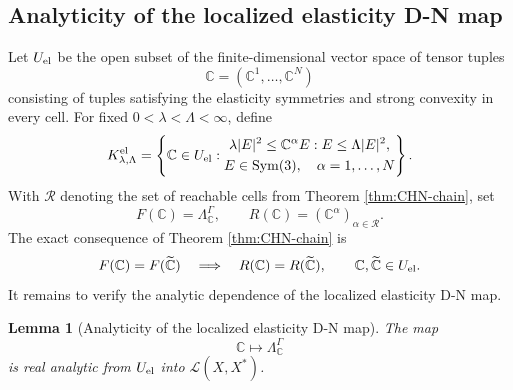 \documentclass[12pt,oneside]{amsart}
\newtheorem{lemma}[theorem]{Lemma}
\newcommand{\cL}{\mathcal L}
\newcommand{\cR}{\mathcal R}
\newcommand{\Sym}{\operatorname{Sym}}
\begin{document}
\subsection{Analyticity of the localized elasticity D-N map}\label{subsec:elastic-reduction}

Let $U_{\rm el}$ be the open subset of the finite-dimensional vector space of tensor tuples
\[
        \mathbb C=(\mathbb C^1,\ldots,\mathbb C^N)
\]
consisting of tuples satisfying the elasticity symmetries and strong convexity in every cell.  For fixed $0<\lambda<\Lambda<\infty$, define
\[
K_{\lambda,\Lambda}^{\rm el}
=
\left\{\mathbb C\in U_{\rm el}:
\begin{gathered}
\lambda |E|^2\le \mathbb C^\alpha E:E\le\Lambda |E|^2,\\
E\in\Sym(3),\quad \alpha=1,\ldots,N
\end{gathered}
\right\}.
\]
With $\cR$ denoting the set of reachable cells from Theorem \ref{thm:CHN-chain}, set
\[
        F(\mathbb C)=\Lambda_{\mathbb C}^\Gamma,
        \qquad
        R(\mathbb C)=(\mathbb C^\alpha)_{\alpha\in\cR} .
\]
The exact consequence of Theorem \ref{thm:CHN-chain} is
\[
        F(\mathbb C)=F(\widetilde{\mathbb C})
        \quad\Longrightarrow\quad
        R(\mathbb C)=R(\widetilde{\mathbb C}),
        \qquad \mathbb C,\widetilde{\mathbb C}\in U_{\rm el}.
\]
It remains to verify the analytic dependence of the localized elasticity D-N map.

\begin{lemma}[Analyticity of the localized elasticity D-N map]\label{lem:elastic-analytic}
The map
\[
        \mathbb C\mapsto\Lambda_{\mathbb C}^\Gamma
\]
is real analytic from $U_{\rm el}$ into $\cL(X,X^*)$.
\end{lemma}
\end{document}
